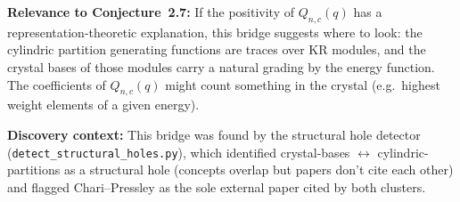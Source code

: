 \documentclass[11pt]{article}
\begin{document}
\medskip
\noindent\textbf{Relevance to Conjecture~2.7:}
If the positivity of $Q_{n,c}(q)$ has a representation-theoretic
explanation, this bridge suggests where to look: the cylindric
partition generating functions are traces over KR modules, and the
crystal bases of those modules carry a natural grading by
the energy function.  The coefficients of $Q_{n,c}(q)$ might
count something in the crystal (e.g.\ highest weight elements
of a given energy).

\medskip
\noindent\textbf{Discovery context:}
This bridge was found by the structural hole detector
(\texttt{detect\_structural\_holes.py}), which identified
crystal-bases $\leftrightarrow$ cylindric-partitions as a
structural hole (concepts overlap but papers don't cite each other)
and flagged Chari--Pressley as the sole external paper cited by
both clusters.
\end{document}
